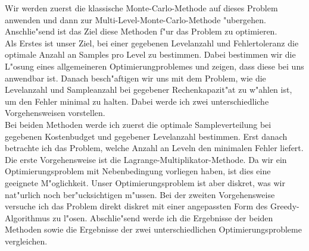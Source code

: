 Wir werden zuerst die klassische Monte-Carlo-Methode auf dieses Problem anwenden und dann zur Multi-Level-Monte-Carlo-Methode "ubergehen.
Anschlie"send ist das Ziel diese Methoden f"ur das Problem zu optimieren.\\
Als Erstes ist unser Ziel, bei einer gegebenen Levelanzahl und Fehlertoleranz die optimale Anzahl an Samples pro Level zu bestimmen.
Dabei bestimmen wir die L"osung eines allgemeineren Optimierungproblemes und zeigen, dass diese bei uns anwendbar ist.
Danach besch"aftigen wir uns mit dem Problem, wie die Levelanzahl und Sampleanzahl bei gegebener Rechenkapazit"at zu w"ahlen ist, um den Fehler minimal zu halten. Dabei werde ich zwei unterschiedliche Vorgehensweisen vorstellen.\\ Bei beiden Methoden werde ich zuerst die optimale Sampleverteilung bei gegebenen Kostenbudget und gegebener Levelanzahl bestimmen. Erst danach betrachte ich das Problem, welche Anzahl an Leveln den minimalen Fehler liefert.\\
Die erste Vorgehensweise ist die Lagrange-Multiplikator-Methode. Da wir ein Optimierungsproblem mit Nebenbedingung vorliegen haben, ist dies eine geeignete M"oglichkeit. Unser Optimierungsproblem ist aber diskret, was wir nat"urlich noch ber"ucksichtigen m"ussen.
Bei der zweiten Vorgehensweise versuche ich das Problem direkt diskret mit einer angepassten Form des Greedy-Algorithmus zu l"osen. Abschlie"send werde ich die Ergebnisse der beiden Methoden  sowie die Ergebnisse der zwei unterschiedlichen Optimierungsprobleme vergleichen.\\[0,2cm]




